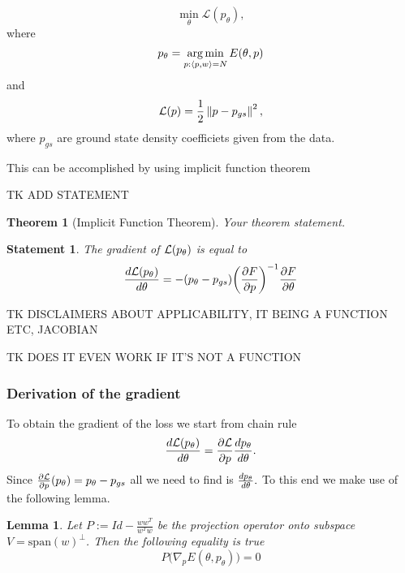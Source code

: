 \documentclass[a4paper,10pt]{report}
\newtheorem{theorem}{Theorem}
\newtheorem{statement}{Statement}
\newtheorem{lemma}{Lemma}
\begin{document}
\begin{equation}
 \min_\theta \mathcal{L}(p_\theta),
\end{equation}
where
\begin{equation}
 p_\theta = \operatorname*{arg\,min}_{p: \langle p, w \rangle=N} E(\theta, p)
\end{equation}
and
\begin{equation}
 \mathcal{L}(p) = \frac{1}{2} \left\|p-p_{gs}\right\|^2,
\end{equation}
where $p_{gs}$ are ground state density coefficiets given from the data.

This can be accomplished by using implicit function theorem

TK ADD STATEMENT
\begin{theorem}[Implicit Function Theorem]
Your theorem statement.
\end{theorem}

\begin{statement}
The gradient of $\mathcal{L}(p_\theta)$ is equal to
 \begin{equation}
 \frac{d\mathcal{L}(p_\theta)}{d \theta} = -(p_\theta - p_{gs}) \bigg(\frac{\partial F}{\partial p}\bigg)^{-1}  \frac{\partial F}{\partial \theta}
\end{equation}
\end{statement}


TK DISCLAIMERS ABOUT APPLICABILITY, IT BEING A FUNCTION ETC, JACOBIAN

TK DOES IT EVEN WORK IF IT'S NOT A FUNCTION
\subsubsection{Derivation of the gradient}
To obtain the gradient of the loss we start from chain rule
\begin{equation}
 \frac{d\mathcal{L}(p_\theta)}{d \theta} = \frac{\partial \mathcal{L}}{\partial p}\frac{dp_\theta}{d \theta}.
\end{equation}
Since $\frac{\partial \mathcal{L}}{\partial p}(p_\theta )= p_\theta-p_{gs}$ all we need to find is $\frac{dp_\theta}{d \theta}.$ To this end we make use of the following lemma.

\begin{lemma}
 Let $P := Id -\frac{ww^T}{w^Tw} $ be the projection operator onto subspace $V = \text{span}(w)^{\perp}$. Then the following equality is true
 \begin{equation}
  P\big(\nabla_p E(\theta, p_\theta)\big) = 0
 \end{equation}

\end{lemma}
\end{document}
